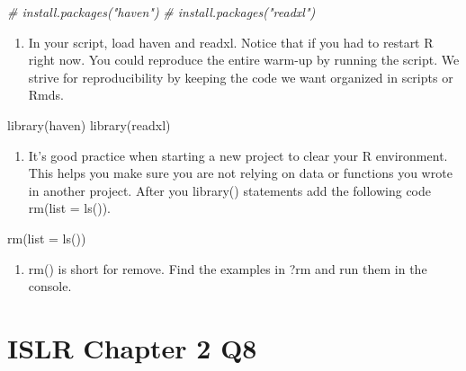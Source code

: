 \documentclass[
]{article}
\newenvironment{Shaded}{\begin{snugshade}}{\end{snugshade}}
\newcommand{\AttributeTok}[1]{\textcolor[rgb]{0.77,0.63,0.00}{#1}}
\newcommand{\CommentTok}[1]{\textcolor[rgb]{0.56,0.35,0.01}{\textit{#1}}}
\newcommand{\FunctionTok}[1]{\textcolor[rgb]{0.00,0.00,0.00}{#1}}
\newcommand{\NormalTok}[1]{#1}
\providecommand{\tightlist}{%
  \setlength{\itemsep}{0pt}\setlength{\parskip}{0pt}}
\begin{document}
\begin{Shaded}
\begin{Highlighting}[]
\CommentTok{\# install.packages("haven")}
\CommentTok{\# install.packages("readxl")}
\end{Highlighting}
\end{Shaded}

\begin{enumerate}
\def\labelenumi{\arabic{enumi}.}
\setcounter{enumi}{3}
\tightlist
\item
  In your script, load haven and readxl. Notice that if you had to
  restart R right now. You could reproduce the entire warm-up by running
  the script. We strive for reproducibility by keeping the code we want
  organized in scripts or Rmds.
\end{enumerate}

\begin{Shaded}
\begin{Highlighting}[]
\FunctionTok{library}\NormalTok{(haven)}
\FunctionTok{library}\NormalTok{(readxl)}
\end{Highlighting}
\end{Shaded}

\begin{enumerate}
\def\labelenumi{\arabic{enumi}.}
\setcounter{enumi}{4}
\tightlist
\item
  It's good practice when starting a new project to clear your R
  environment. This helps you make sure you are not relying on data or
  functions you wrote in another project. After you library() statements
  add the following code rm(list = ls()).
\end{enumerate}

\begin{Shaded}
\begin{Highlighting}[]
\FunctionTok{rm}\NormalTok{(}\AttributeTok{list =} \FunctionTok{ls}\NormalTok{())}
\end{Highlighting}
\end{Shaded}

\begin{enumerate}
\def\labelenumi{\arabic{enumi}.}
\setcounter{enumi}{5}
\tightlist
\item
  rm() is short for remove. Find the examples in ?rm and run them in the
  console.
\end{enumerate}

\hypertarget{islr-chapter-2-q8}{%
\section{ISLR Chapter 2 Q8}\label{islr-chapter-2-q8}}
\end{document}
